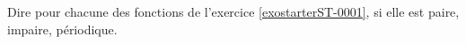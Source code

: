 
\begin{exercice}\label{exostarterST-0005}

Dire pour chacune des fonctions de l'exercice \ref{exostarterST-0001}, si elle est paire, impaire, périodique. 

\end{exercice}
